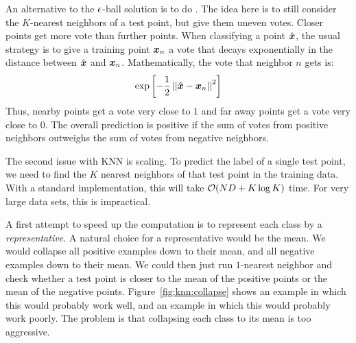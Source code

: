 An alternative to the $\epsilon$-ball solution is to do .  The idea here is to still consider the
$K$-nearest neighbors of a test point, but give them uneven votes.
Closer points get more vote than further points.  When classifying a
point $\hat{{\boldsymbol{x}}}$, the usual strategy is to give a training point
${\boldsymbol{x}}_n$ a vote that decays exponentially in the distance between
$\hat{{\boldsymbol{x}}}$ and ${\boldsymbol{x}}_n$.  Mathematically, the vote that neighbor $n$
gets is:
\begin{equation} \label{eq:expdecay}
\exp\left[ - \frac 1 2 \left\vert\left\vert \hat{{\boldsymbol{x}}} - {\boldsymbol{x}}_n \right\vert\right\vert^2 \right]
\end{equation}
Thus, nearby points get a vote very close to $1$ and far away points
get a vote very close to $0$.  The overall prediction is positive if
the sum of votes from positive neighbors outweighs the sum of votes
from negative neighbors.


The second issue with KNN is scaling.  To predict the label of a
single test point, we need to find the $K$ nearest neighbors of that
test point in the training data.  With a standard implementation, this
will take $\mathcal{O}(N D + K \log K)$ time.  For very
large data sets, this is impractical.


A first attempt to speed up the computation is to represent each class
by a \emph{representative.}  A natural choice for a representative
would be the mean.  We would collapse all positive examples down to
their mean, and all negative examples down to their mean.  We could
then just run $1$-nearest neighbor and check whether a test point is
closer to the mean of the positive points or the mean of the negative
points.  Figure~\ref{fig:knn:collapse} shows an example in which this
would probably work well, and an example in which this would probably
work poorly.  The problem is that collapsing each class to its mean is
too aggressive.


